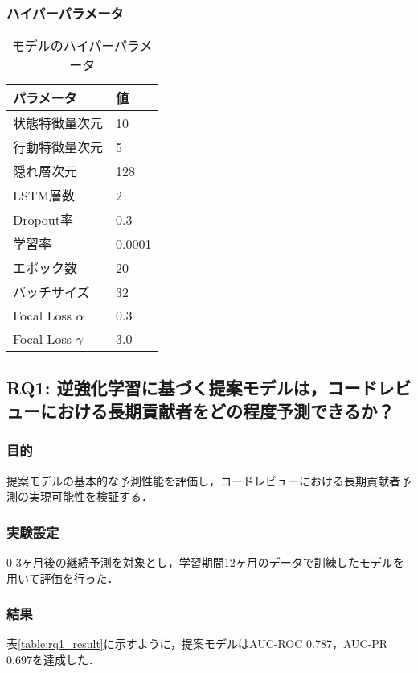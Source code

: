 \subsubsection{ハイパーパラメータ}
\begin{table}[h]
    \centering
    \caption{モデルのハイパーパラメータ}
    \begin{tabularx}{\columnwidth}{XX}
        \hline
        パラメータ & 値 \\
        \hline
        状態特徴量次元 & 10 \\
        行動特徴量次元 & 5 \\
        隠れ層次元 & 128 \\
        LSTM層数 & 2 \\
        Dropout率 & 0.3 \\
        学習率 & 0.0001 \\
        エポック数 & 20 \\
        バッチサイズ & 32 \\
        Focal Loss $\alpha$ & 0.3 \\
        Focal Loss $\gamma$ & 3.0 \\
        \hline
    \end{tabularx}
    \label{table:hyperparameters}
\end{table}

\subsection{RQ1: 逆強化学習に基づく提案モデルは，コードレビューにおける長期貢献者をどの程度予測できるか？}

\subsubsection{目的}
提案モデルの基本的な予測性能を評価し，コードレビューにおける長期貢献者予測の実現可能性を検証する．

\subsubsection{実験設定}
0-3ヶ月後の継続予測を対象とし，学習期間12ヶ月のデータで訓練したモデルを用いて評価を行った．

\subsubsection{結果}
表\ref{table:rq1_result}に示すように，提案モデルはAUC-ROC 0.787，AUC-PR 0.697を達成した．


